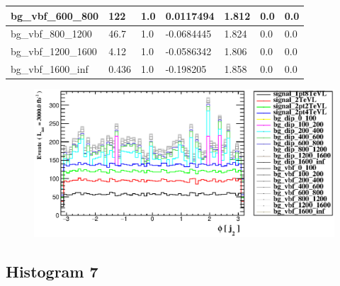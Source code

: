 \documentclass[a4paper, 10pt]{article}
\begin{document}
\begin{table}[H]
\begin{center}
\begin{tabular}{|m{23.0mm}|m{23.0mm}|m{18.0mm}|m{19.0mm}|m{19.0mm}|m{19.0mm}|m{19.0mm}|}
      \hline
      {\cellcolor{white}         bg\_vbf\_600\_800}& {\cellcolor{white}         122}& {\cellcolor{white}         1.0}& {\cellcolor{white}         0.0117494}& {\cellcolor{white}         1.812}& {\cellcolor{green}         0.0}& {\cellcolor{green}         0.0}\\
      \hline
      {\cellcolor{white}         bg\_vbf\_800\_1200}& {\cellcolor{white}         46.7}& {\cellcolor{white}         1.0}& {\cellcolor{white}         -0.0684445}& {\cellcolor{white}         1.824}& {\cellcolor{green}         0.0}& {\cellcolor{green}         0.0}\\
      \hline
      {\cellcolor{white}         bg\_vbf\_1200\_1600}& {\cellcolor{white}         4.12}& {\cellcolor{white}         1.0}& {\cellcolor{white}         -0.0586342}& {\cellcolor{white}         1.806}& {\cellcolor{green}         0.0}& {\cellcolor{green}         0.0}\\
      \hline
      {\cellcolor{white}         bg\_vbf\_1600\_inf}& {\cellcolor{white}         0.436}& {\cellcolor{white}         1.0}& {\cellcolor{white}         -0.198205}& {\cellcolor{white}         1.858}& {\cellcolor{green}         0.0}& {\cellcolor{green}         0.0}\\
\hline
    \end{tabular}
  \end{center}
\end{table}

\begin{figure}[H]
  \begin{center}
    \includegraphics[scale=0.45]{selection_5.eps}\\
\caption{   }
  \end{center}
\end{figure}
      \newpage
\subsection{ Histogram 7}
\end{document}
